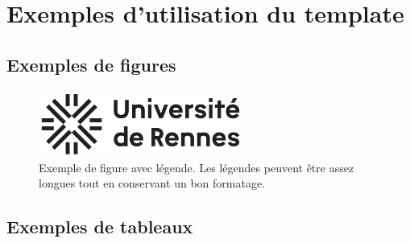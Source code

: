 \documentclass[12pt,a4paper]{report}
\begin{document}
\dominitoc



\tableofcontents
\listoffigures
\listoftables

\pagestyle{fancy}



\chapter{Exemples d'utilisation du template}
\minitoc
\newpage

\section{Exemples de figures}
\label{sec:exemples-de-figures}

\begin{figure}[htbp] 
    \centering
    \includegraphics[width=0.6\textwidth]{assets/figures/logos/Logo_Univ_Rennes.png}
    \caption{Exemple de figure avec légende. Les légendes peuvent être assez longues tout en conservant un bon formatage.}
    \label{fig:exemple_figure}
\end{figure}


\section{Exemples de tableaux}
\label{sec:exemples-de-tableaux}
\end{document}
